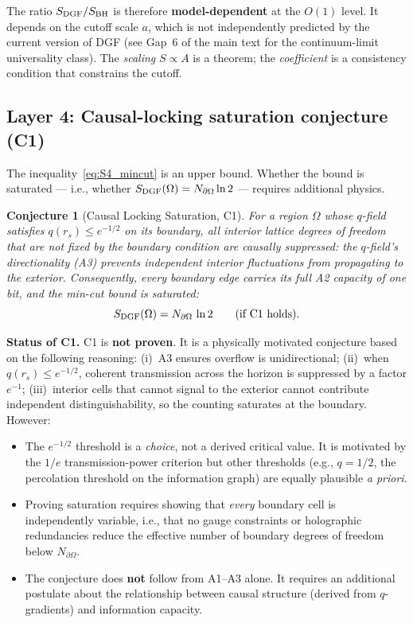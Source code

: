 \documentclass[aps,prd,twocolumn,superscriptaddress,nofootinbib,floatfix]{revtex4-2}
\newtheorem{conjecture}[theorem]{Conjecture}
\begin{document}
The ratio $S_{\rm DGF}/S_{\rm BH}$ is therefore \textbf{model-dependent}
at the $O(1)$ level.  It depends on the cutoff scale $a$, which is not
independently predicted by the current version of DGF (see Gap~6 of the
main text for the continuum-limit universality class).  The \emph{scaling}
$S\propto A$ is a theorem; the \emph{coefficient} is a consistency
condition that constrains the cutoff.

\subsection{Layer 4: Causal-locking saturation conjecture (C1)}
\label{sec:S4_layer4}

The inequality~\eqref{eq:S4_mincut} is an upper bound.  Whether the bound is
saturated --- i.e., whether $S_{\rm DGF}(\Omega) = N_{\partial\Omega}\ln 2$
--- requires additional physics.

\begin{conjecture}[Causal Locking Saturation, C1]
\label{conj:C1}
For a region $\Omega$ whose $q$-field satisfies $q(r_s)\le e^{-1/2}$ on
its boundary, all interior lattice degrees of freedom that are not fixed
by the boundary condition are \emph{causally suppressed}: the
$q$-field's directionality (A3) prevents independent interior
fluctuations from propagating to the exterior.  Consequently, every
boundary edge carries its full A2 capacity of one bit, and the min-cut
bound is saturated:
\begin{equation}
  S_{\rm DGF}(\Omega) = N_{\partial\Omega}\,\ln 2
  \qquad\text{(if C1 holds)}.
  \label{eq:S4_saturated}
\end{equation}
\end{conjecture}

\textbf{Status of C1.}  C1 is \textbf{not proven}.  It is a physically
motivated conjecture based on the following reasoning: (i)~A3 ensures
overflow is unidirectional; (ii)~when $q(r_s)\le e^{-1/2}$, coherent
transmission across the horizon is suppressed by a factor $e^{-1}$;
(iii)~interior cells that cannot signal to the exterior cannot contribute
independent distinguishability, so the counting saturates at the boundary.
However:
\begin{itemize}
  \item The $e^{-1/2}$ threshold is a \emph{choice}, not a derived critical
    value.  It is motivated by the $1/e$ transmission-power criterion but
    other thresholds (e.g., $q=1/2$, the percolation threshold on the
    information graph) are equally plausible \emph{a priori}.
  \item Proving saturation requires showing that \emph{every} boundary cell
    is independently variable, i.e., that no gauge constraints or
    holographic redundancies reduce the effective number of boundary degrees
    of freedom below $N_{\partial\Omega}$.
  \item The conjecture does \textbf{not} follow from A1--A3 alone.  It
    requires an additional postulate about the relationship between causal
    structure (derived from $q$-gradients) and information capacity.
\end{itemize}
\end{document}
